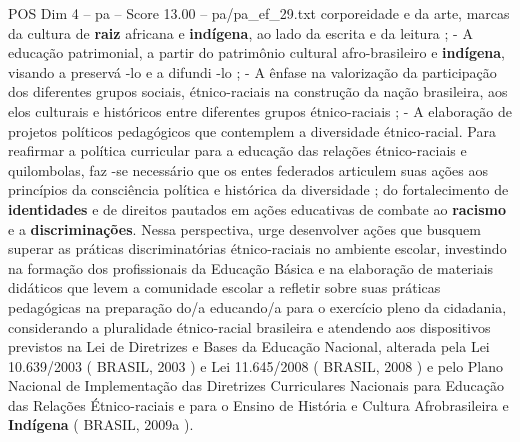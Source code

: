\begin{textsample}{POS Dim 4 – pa – Score 13.00 – pa/pa\_ef\_29.txt}
corporeidade e da arte, marcas da cultura de \textbf{raiz} africana e \textbf{indígena}, ao lado da escrita e da leitura ; - A educação patrimonial, a partir do patrimônio cultural afro-brasileiro e \textbf{indígena}, visando a preservá -lo e a difundi -lo ; - A ênfase na valorização da participação dos diferentes grupos sociais, étnico-raciais na construção da nação brasileira, aos elos culturais e históricos entre diferentes grupos étnico-raciais ; - A elaboração de projetos políticos pedagógicos que contemplem a diversidade étnico-racial.
Para reafirmar a política curricular para a educação das relações étnico-raciais e quilombolas, faz -se necessário que os entes federados articulem suas ações aos princípios da consciência política e histórica da diversidade ; do fortalecimento de \textbf{identidades} e de direitos pautados em ações educativas de combate ao \textbf{racismo} e a \textbf{discriminações}.
Nessa perspectiva, urge desenvolver ações que busquem superar as práticas discriminatórias étnico-raciais no ambiente escolar, investindo na formação dos profissionais da Educação Básica e na elaboração de materiais didáticos que levem a comunidade escolar a refletir sobre suas práticas pedagógicas na preparação do/a educando/a para o exercício pleno da cidadania, considerando a pluralidade étnico-racial brasileira e atendendo aos dispositivos previstos na Lei de Diretrizes e Bases da Educação Nacional, alterada pela Lei 10.639/2003 ( BRASIL, 2003 ) e Lei 11.645/2008 ( BRASIL, 2008 ) e pelo Plano Nacional de Implementação das Diretrizes Curriculares Nacionais para Educação das Relações Étnico-raciais e para o Ensino de História e Cultura Afrobrasileira e \textbf{Indígena} ( BRASIL, 2009a ).

\end{textsample}
